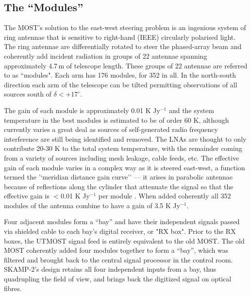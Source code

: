\subsection{The ``Modules''}
The MOST's solution to the east-west steering problem is an ingenious system of ring antennae that is sensitive to right-hand (IEEE) circularly polarised light. The ring antennae are differentially rotated to steer the phased-array beam and coherently add incident radiation in groups of 22 antennae spanning approximately 4.7\,m of telescope length. These groups of 22 antennae are referred to as ``modules". Each arm has 176 modules, for 352 in all. In the north-south direction each arm of the telescope can be tilted permitting observations of all sources south of $\delta<+17^\circ$. 

The gain of each module is approximately 0.01 K Jy$^{-1}$ and the system temperature in the best modules is estimated to be of order 60 K, although currently varies a great deal as sources of self-generated radio frequency interference are still being identified and removed. The LNAs are thought to only contribute 20-30 K to the total system temperature, with the remainder coming from a variety of sources including mesh leakage, cable feeds, etc. The effective gain of each module varies in a complex way as it is steered east-west, a function termed the '`meridian distance gain curve'' --- it arises in parabolic antennae because of reflections along the cylinder that attenuate the signal so that the effective gain is $<$0.01 K Jy$^{-1}$ per module \cite{Hunstead_1996}. When added coherently all 352 modules of the antenna combine to have a gain of 3.5 K Jy$^{-1}$.

Four adjacent modules form a ``bay'' and have their independent signals passed via shielded cable to each bay's digital receiver, or "RX box". Prior to the RX boxes, the UTMOST signal feed is entirely equivalent to the old MOST. The old MOST coherently added four modules together to form a ``bay'', which was filtered and brought back to the central signal processor in the control room. SKAMP-2's design retains all four independent inputs from a bay, thus quadrupling the field of view, and brings back the digitized signal on optical fibres.
  